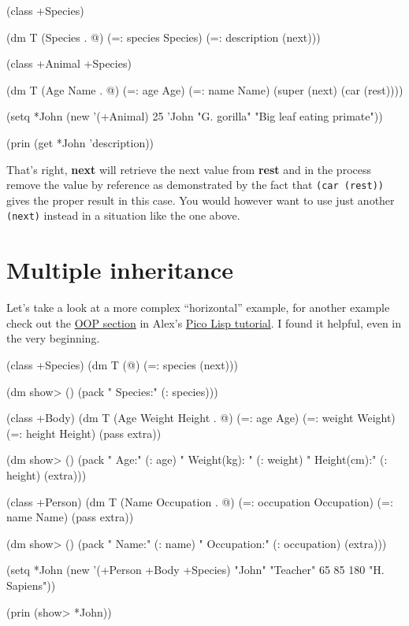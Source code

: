 \begin{wideverbatim}
(class +Species)

(dm T (Species . @)
    (=: species Species)
    (=: description (next)))

(class +Animal +Species)

(dm T (Age Name . @)
    (=: age Age)
    (=: name Name)
    (super (next) (car (rest))))

(setq *John (new '(+Animal) 25 'John "G. gorilla" 
      "Big leaf eating primate"))

(prin (get *John 'description))
\end{wideverbatim}

That's right, \textbf{next} will retrieve the next value from
\textbf{rest} and in the process remove the value by reference as
demonstrated by the fact that \texttt{(car (rest))} gives the proper
result in this case. You would however want to use just another
\texttt{(next)} instead in a situation like the one above.


\section{Multiple inheritance}
\label{sec:more-oo}

Let's take a look at a more complex ``horizontal'' example, for
another example check out the
\href{http://www.software-lab.de/tut.html#oop}{OOP section} in Alex's
\href{http://www.software-lab.de/tut.html}{Pico Lisp tutorial}. I
found it helpful, even in the very beginning.

\begin{wideverbatim}
(class +Species)
(dm T (@)
    (=: species (next)))

(dm show> ()
    (pack " Species:" (: species)))

(class +Body)
(dm T (Age Weight Height . @)
    (=: age Age)
    (=: weight Weight)
    (=: height Height)
    (pass extra))

(dm show> ()
    (pack " Age:" (: age) " Weight(kg):
     " (: weight) " Height(cm):" (: height) (extra)))

(class +Person)
(dm T (Name Occupation . @)
    (=: occupation Occupation)
    (=: name Name)
    (pass extra))

(dm show> ()
    (pack " Name:" (: name) " Occupation:" (: occupation) (extra)))

(setq *John (new '(+Person +Body +Species) 
      "John" "Teacher" 65 85 180 "H. Sapiens"))

(prin (show> *John))
\end{wideverbatim}

